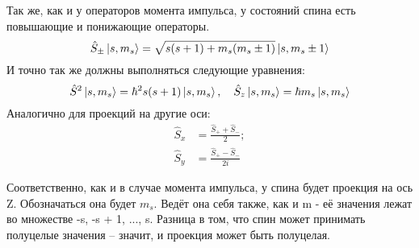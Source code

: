 Так же, как и у операторов момента импульса, у состояний спина есть повышающие и понижающие операторы.
\[
\hat{S}_{\pm}\ket{s, m_s} = \sqrt{s(s+1) + m_s(m_s \pm 1)}\ket{s, m_s \pm 1}
\]
И точно так же должны выполняться следующие уравнения:
\[
\hat{S}^2\ket{s,m_s} = \hbar^2 s(s+ 1)\ket{s,m_s}, \quad \hat{S}_z\ket{s,m_s} = \hbar m_s\ket{s,m_s}
\]
Аналогично для проекций на другие оси:
\begin{align*}
    \hat{S}_x & = \frac{\hat{S}_+ + \hat{S}_-}{2};\\
    \hat{S}_y & = \frac{\hat{S}_+ - \hat{S}_-}{2i}
\end{align*}

Соответственно, как и в случае момента импульса, у спина будет проекция на ось Z. Обозначаться она будет $m_s$. Ведёт она себя также, как и m - её значения лежат во множестве {-s, -s + 1, ..., s}. Разница в том, что спин может принимать полуцелые значения -- значит, и проекция может быть полуцелая.

